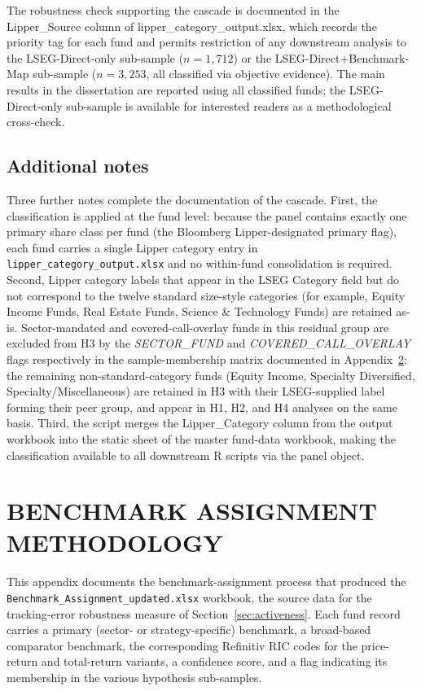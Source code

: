 \documentclass[12pt, oneside]{report}
\newcommand{\flag}[1]{\textit{#1}}
\begin{document}
The robustness check supporting the cascade is documented in the
Lipper\_Source column of lipper\_category\_output.xlsx,
which records the priority tag for each fund and permits restriction
of any downstream analysis to the LSEG-Direct-only sub-sample
($n = 1{,}712$) or the LSEG-Direct$+$Benchmark-Map sub-sample
($n = 3{,}253$, all classified via objective evidence). The main
results in the dissertation are reported using all classified funds;
the LSEG-Direct-only sub-sample is available for interested readers
as a methodological cross-check.

\section{Additional notes}
\label{sec:lipper_notes}

\noindent Three further notes complete the documentation of the
cascade. First, the classification is applied at the fund level: because the
panel contains exactly one primary share class per fund (the
Bloomberg Lipper-designated primary flag), each fund carries a single
Lipper category entry in \texttt{lipper\_category\_output.xlsx} and
no within-fund consolidation is required. Second, Lipper
category labels that appear in the LSEG Category field but do not
correspond to the twelve standard size-style categories (for example,
Equity Income Funds, Real Estate Funds, Science \& Technology Funds)
are retained as-is. Sector-mandated and covered-call-overlay funds
in this residual group are excluded from H3 by the
\flag{SECTOR\_FUND} and \flag{COVERED\_CALL\_OVERLAY} flags
respectively in the sample-membership matrix
documented in Appendix~\ref{app:benchmark}; the remaining
non-standard-category funds (Equity Income, Specialty Diversified,
Specialty/Miscellaneous) are retained in H3 with their LSEG-supplied
label forming their peer group, and appear in H1, H2, and H4
analyses on the same basis. Third,
the script merges the Lipper\_Category column from the
output workbook into the static sheet of the master fund-data
workbook, making the classification available to all downstream R
scripts via the panel object.

\chapter{BENCHMARK ASSIGNMENT METHODOLOGY}
\label{app:benchmark}

\noindent This appendix documents the benchmark-assignment process
that produced the \texttt{Benchmark\_Assignment\_updated.xlsx}
workbook, the source data for the tracking-error robustness measure
of Section~\ref{sec:activeness}. Each fund record carries
a primary (sector- or strategy-specific) benchmark, a broad-based
comparator benchmark, the corresponding Refinitiv RIC codes for the
price-return and total-return variants, a confidence score, and a
flag indicating its membership in the various hypothesis sub-samples.
\end{document}
